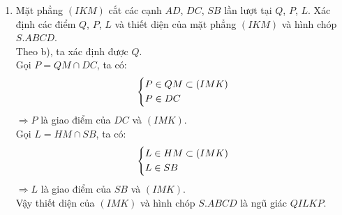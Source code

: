 \begin{bt}
{\begin{enumerate}
$\Rightarrow QI \parallel SD$\\
$\Rightarrow SD \parallel (IMK)$.
\item Mặt phẳng $(IKM)$ cắt các cạnh $AD$, $DC$, $SB$ lần lượt tại $Q$, $P$, $L$. Xác định các điểm $Q$, $P$, $L$ và thiết diện của mặt phẳng $(IKM)$ và hình chóp $S.ABCD$.\\
Theo b), ta xác định được $Q$.\\
Gọi $P = QM \cap DC$, ta có:
$$\left\{\begin{aligned}&P \in QM \subset (IMK)\\ &P \in DC\end{aligned}\right.$$
$\Rightarrow P$ là giao điểm của $DC$ và $(IMK)$.\\
Gọi $L = HM \cap SB$, ta có:
$$\left\{\begin{aligned}&L \in HM \subset (IMK)\\ &L \in SB\end{aligned}\right.$$
$\Rightarrow L$ là giao điểm của $SB$ và $(IMK)$.\\
Vậy thiết diện của $(IMK)$ và hình chóp $S.ABCD$ là ngũ giác $QILKP$.
\end{enumerate}
}

\end{bt}


